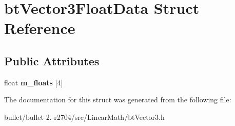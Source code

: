 \hypertarget{structbt_vector3_float_data}{\section{bt\+Vector3\+Float\+Data Struct Reference}
\label{structbt_vector3_float_data}
}
\subsection*{Public Attributes}
\begin{DoxyCompactItemize}
\item 
\hypertarget{structbt_vector3_float_data_ab246fb8dc0af06cfb3260d836591dc46}{float {\bfseries m\+\_\+floats} \mbox{[}4\mbox{]}}\label{structbt_vector3_float_data_ab246fb8dc0af06cfb3260d836591dc46}

\end{DoxyCompactItemize}


The documentation for this struct was generated from the following file\+:\begin{DoxyCompactItemize}
\item 
bullet/bullet-\/2.-\/r2704/src/\+Linear\+Math/bt\+Vector3.\+h\end{DoxyCompactItemize}
